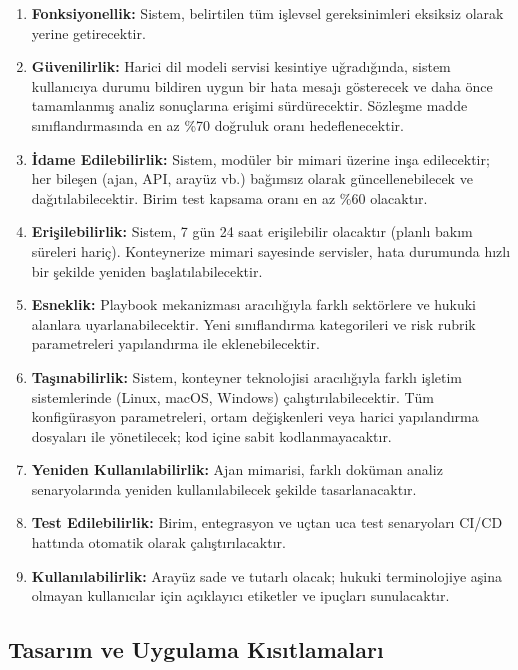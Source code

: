 \documentclass[12pt, a4paper]{article}
\begin{document}
\begin{enumerate}[leftmargin=2cm]
    \item \textbf{Fonksiyonellik:} Sistem, belirtilen tüm işlevsel gereksinimleri eksiksiz olarak yerine getirecektir.
    \item \textbf{Güvenilirlik:} Harici dil modeli servisi kesintiye uğradığında, sistem kullanıcıya durumu bildiren uygun bir hata mesajı gösterecek ve daha önce tamamlanmış analiz sonuçlarına erişimi sürdürecektir. Sözleşme madde sınıflandırmasında en az \%70 doğruluk oranı hedeflenecektir.
    \item \textbf{İdame Edilebilirlik:} Sistem, modüler bir mimari üzerine inşa edilecektir; her bileşen (ajan, API, arayüz vb.) bağımsız olarak güncellenebilecek ve dağıtılabilecektir. Birim test kapsama oranı en az \%60 olacaktır.
    \item \textbf{Erişilebilirlik:} Sistem, 7 gün 24 saat erişilebilir olacaktır (planlı bakım süreleri hariç). Konteynerize mimari sayesinde servisler, hata durumunda hızlı bir şekilde yeniden başlatılabilecektir.
    \item \textbf{Esneklik:} Playbook mekanizması aracılığıyla farklı sektörlere ve hukuki alanlara uyarlanabilecektir. Yeni sınıflandırma kategorileri ve risk rubrik parametreleri yapılandırma ile eklenebilecektir.
    \item \textbf{Taşınabilirlik:} Sistem, konteyner teknolojisi aracılığıyla farklı işletim sistemlerinde (Linux, macOS, Windows) çalıştırılabilecektir. Tüm konfigürasyon parametreleri, ortam değişkenleri veya harici yapılandırma dosyaları ile yönetilecek; kod içine sabit kodlanmayacaktır.
    \item \textbf{Yeniden Kullanılabilirlik:} Ajan mimarisi, farklı doküman analiz senaryolarında yeniden kullanılabilecek şekilde tasarlanacaktır.
    \item \textbf{Test Edilebilirlik:} Birim, entegrasyon ve uçtan uca test senaryoları CI/CD hattında otomatik olarak çalıştırılacaktır.
    \item \textbf{Kullanılabilirlik:} Arayüz sade ve tutarlı olacak; hukuki terminolojiye aşina olmayan kullanıcılar için açıklayıcı etiketler ve ipuçları sunulacaktır.
\end{enumerate}

\subsection{Tasarım ve Uygulama Kısıtlamaları}
\end{document}
